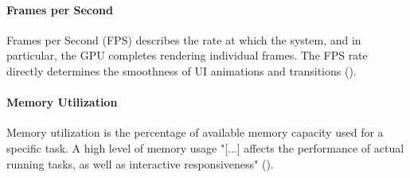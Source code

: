 \paragraph*{Frames per Second}\label{paragraph::fps}\hfill \break
Frames per Second (FPS) describes the rate at which the system, and in particular, the GPU
completes rendering individual frames. The FPS rate directly determines the smoothness of UI
animations and transitions (\cite{Google2020}).

\paragraph*{Memory Utilization}\label{paragraph::memory_utilization}\hfill \break
Memory utilization is the percentage of available memory capacity used for a specific task. 
A high level of memory usage "[...] affects the performance of actual running tasks, as well as
interactive responsiveness" (\cite{Ljubuncic2015}).

